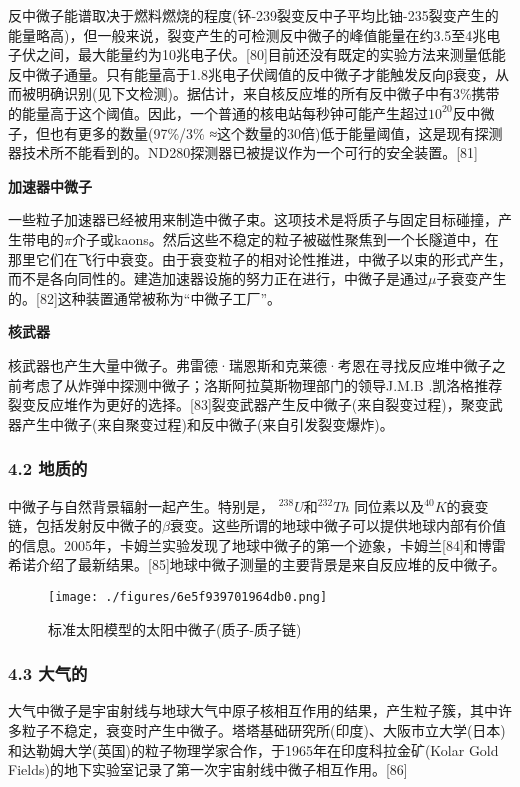 反中微子能谱取决于燃料燃烧的程度(钚-239裂变反中子平均比铀-235裂变产生的能量略高)，但一般来说，裂变产生的可检测反中微子的峰值能量在约3.5至4兆电子伏之间，最大能量约为10兆电子伏。[80]目前还没有既定的实验方法来测量低能反中微子通量。只有能量高于1.8兆电子伏阈值的反中微子才能触发反向β衰变，从而被明确识别(见下文检测)。据估计，来自核反应堆的所有反中微子中有3\%携带的能量高于这个阈值。因此，一个普通的核电站每秒钟可能产生超过$10^{20}$反中微子，但也有更多的数量(97\%/3\% ≈这个数量的30倍)低于能量阈值，这是现有探测器技术所不能看到的。ND280探测器已被提议作为一个可行的安全装置。[81]

\textbf{加速器中微子}

一些粒子加速器已经被用来制造中微子束。这项技术是将质子与固定目标碰撞，产生带电的$\pi$介子或kaons。然后这些不稳定的粒子被磁性聚焦到一个长隧道中，在那里它们在飞行中衰变。由于衰变粒子的相对论性推进，中微子以束的形式产生，而不是各向同性的。建造加速器设施的努力正在进行，中微子是通过$\mu$子衰变产生的。[82]这种装置通常被称为“中微子工厂”。

\textbf{核武器}

核武器也产生大量中微子。弗雷德·瑞恩斯和克莱德·考恩在寻找反应堆中微子之前考虑了从炸弹中探测中微子；洛斯阿拉莫斯物理部门的领导J.M.B .凯洛格推荐裂变反应堆作为更好的选择。[83]裂变武器产生反中微子(来自裂变过程)，聚变武器产生中微子(来自聚变过程)和反中微子(来自引发裂变爆炸)。

\subsubsection{4.2 地质的}
中微子与自然背景辐射一起产生。特别是， $^{238}U$和$^{232}Th$ 同位素以及$^{40}K$的衰变链，包括发射反中微子的$\beta$衰变。这些所谓的地球中微子可以提供地球内部有价值的信息。2005年，卡姆兰实验发现了地球中微子的第一个迹象，卡姆兰[84]和博雷希诺介绍了最新结果。[85]地球中微子测量的主要背景是来自反应堆的反中微子。
\begin{figure}[ht]
\centering
\texttt{[image: ./figures/6e5f939701964db0.png]}
\caption{标准太阳模型的太阳中微子(质子-质子链)} \label{fig_ZWZ_3}
\end{figure}

\subsubsection{4.3 大气的}
大气中微子是宇宙射线与地球大气中原子核相互作用的结果，产生粒子簇，其中许多粒子不稳定，衰变时产生中微子。塔塔基础研究所(印度)、大阪市立大学(日本)和达勒姆大学(英国)的粒子物理学家合作，于1965年在印度科拉金矿(Kolar Gold Fields)的地下实验室记录了第一次宇宙射线中微子相互作用。[86]

